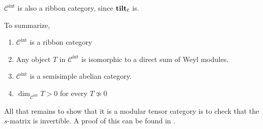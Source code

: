 $\mathcal{C}^\text{int}$ is also a ribbon category, since $\mathbf{tilt}_\ell$ is.

To summarize, 
\begin{prop}
\begin{enumerate}
    \item  $\mathcal{C}^\text{int}$ is a ribbon category
    \item Any object $T$ in $\mathcal{C}^\text{int}$ is isomorphic to a direct sum of Weyl modules.
    \item $\mathcal{C}^\text{int}$ is a semisimple abelian category. 
    \item $\dim_{\mathcal{C}^\text{int}} T > 0$ for every $T \not\simeq 0$
\end{enumerate}
\end{prop}

All that remains to show that it is a modular tensor category is to check that
the $s$-matrix is invertible. A proof of this can be found in \cite{Kirillov2001}.
